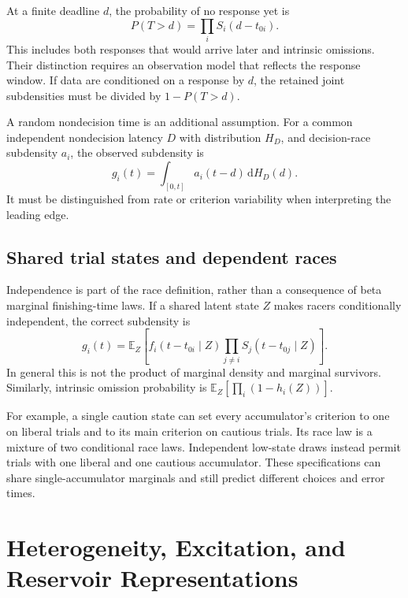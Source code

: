 \documentclass[12pt]{article}
\newcommand{\dd}{\,\mathrm{d}}
\newcommand{\E}{\mathbb{E}}
\theoremstyle{definition}
\theoremstyle{plain}
\theoremstyle{remark}
\begin{document}
At a finite deadline $d$, the probability of no response yet is
\begin{equation}
 P(T>d)=\prod_i S_i(d-t_{0i}).\label{eq:deadline}
\end{equation}
This includes both responses that would arrive later and intrinsic omissions. Their distinction requires an observation model that reflects the response window. If data are conditioned on a response by $d$, the retained joint subdensities must be divided by $1-P(T>d)$.

A random nondecision time is an additional assumption. For a common independent nondecision latency $D$ with distribution $H_D$, and decision-race subdensity $a_i$, the observed subdensity is
\begin{equation}
 g_i(t)=\int_{[0,t]}a_i(t-d)\dd H_D(d).\label{eq:nondecision}
\end{equation}
It must be distinguished from rate or criterion variability when interpreting the leading edge.

\subsection{Shared trial states and dependent races}\label{sec:dependence}
Independence is part of the race definition, rather than a consequence of beta marginal finishing-time laws. If a shared latent state $Z$ makes racers conditionally independent, the correct subdensity is
\begin{equation}
 g_i(t)=\E_Z\left[f_i(t-t_{0i}\mid Z)
                 \prod_{j\ne i}S_j(t-t_{0j}\mid Z)\right].\label{eq:dependent-race}
\end{equation}
In general this is not the product of marginal density and marginal survivors. Similarly, intrinsic omission probability is $\E_Z[\prod_i(1-h_i(Z))]$.

For example, a single caution state can set every accumulator's criterion to one on liberal trials and to its main criterion on cautious trials. Its race law is a mixture of two conditional race laws. Independent low-state draws instead permit trials with one liberal and one cautious accumulator. These specifications can share single-accumulator marginals and still predict different choices and error times.

\section{Heterogeneity, Excitation, and Reservoir Representations}\label{sec:representations}
\end{document}
